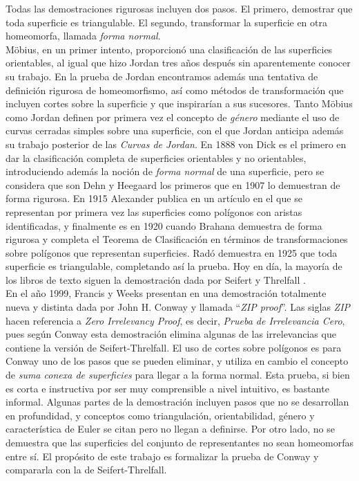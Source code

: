 \documentclass[10pt]{report}
\theoremstyle{definition}
\begin{document}
Todas las demostraciones rigurosas incluyen dos pasos. El primero, demostrar que toda superficie es triangulable. El segundo, transformar la superficie en otra homeomorfa, llamada \textit{forma normal}. \\
Möbius, en un primer intento, proporcionó una clasificación de las superficies orientables, al igual que hizo Jordan \cite{jordan} tres años después sin aparentemente conocer su trabajo. En la prueba de Jordan encontramos además una tentativa de definición rigurosa de homeomorfismo, así como métodos de transformación que incluyen cortes sobre la superficie y que inspirarían a sus sucesores. Tanto Möbius como Jordan definen por primera vez el concepto de \textit{género} mediante el uso de curvas cerradas simples sobre una superficie, con el que Jordan anticipa además su trabajo posterior de las \textit{Curvas de Jordan}.
En 1888 von Dick \cite{vondick} es el primero en dar la clasificación completa de superficies orientables y no orientables, introduciendo además la noción de \textit{forma normal} de una superficie, pero se considera que son Dehn y Heegaard los primeros que en 1907 \cite{dehn} lo demuestran de forma rigurosa. En 1915 Alexander publica en un artículo \cite{alexander} en el que se representan por primera vez las superficies como polígonos con aristas identificadas, y finalmente es en 1920 cuando Brahana \cite{brahana} demuestra de forma rigurosa y completa el Teorema de Clasificación en términos de transformaciones sobre polígonos que representan superficies. Radó \cite{rado} demuestra en 1925 que toda superficie es triangulable, completando así la prueba.
Hoy en día, la mayoría de los libros de texto siguen la demostración dada por Seifert y Threlfall \cite{seifert}.\\

En el año 1999, Francis y Weeks presentan en \cite{zip} una demostración totalmente nueva y distinta dada por John H. Conway y llamada ``\textit{ZIP proof}''. Las siglas \textit{ZIP} hacen referencia a \textit{Zero Irrelevancy Proof}, es decir, \textit{Prueba de Irrelevancia Cero}, pues según Conway esta demostración elimina algunas de las irrelevancias que contiene la versión de Seifert-Threlfall. El uso de cortes sobre polígonos es para Conway uno de los pasos que se pueden eliminar, y utiliza en cambio el concepto de \textit{suma conexa de superficies} para llegar a la forma normal. Esta prueba, si bien es corta e instructiva por ser muy comprensible a nivel intuitivo, es bastante informal. Algunas partes de la demostración incluyen pasos que no se desarrollan en profundidad, y conceptos como triangulación, orientabilidad, género y característica de Euler se citan pero no llegan a definirse. Por otro lado, no se demuestra que las superficies del conjunto de representantes no sean homeomorfas entre sí. El propósito de este trabajo es formalizar la prueba de Conway y compararla con la de Seifert-Threlfall.\\
\end{document}
